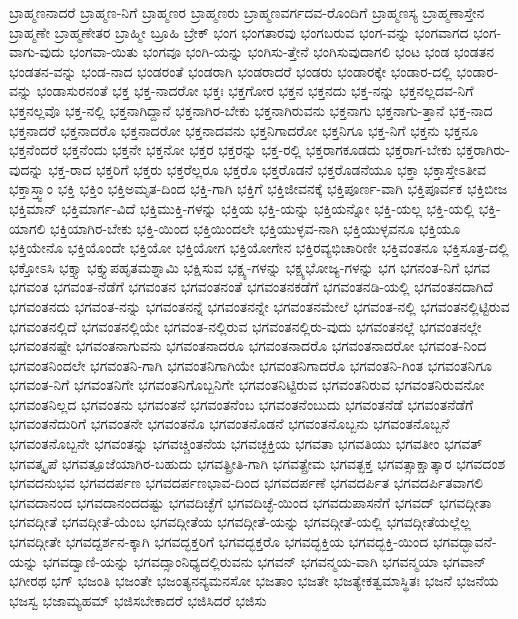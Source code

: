 {ಬ್ರಾಹ್ಮಣನಾದರೆ
ಬ್ರಾಹ್ಮಣ-ನಿಗೆ
ಬ್ರಾಹ್ಮಣರ
ಬ್ರಾಹ್ಮಣರು
ಬ್ರಾಹ್ಮಣವರ್ಗದವ-ರೊಂದಿಗೆ
ಬ್ರಾಹ್ಮಣಸ್ಯ
ಬ್ರಾಹ್ಮಣಾಸ್ತೇನ
ಬ್ರಾಹ್ಮಣೇ
ಬ್ರಾಹ್ಮಣೇತರ
ಬ್ರಾಹ್ಮೀ
ಬ್ರೂಹಿ
ಬ್ರೇಕ್
ಭಂಗ
ಭಂಗತಾರವು
ಭಂಗಬರುವ
ಭಂಗ-ವನ್ನು
ಭಂಗವಾಗದ
ಭಂಗ-ವಾಗು-ವುದು
ಭಂಗವಾ-ಯಿತು
ಭಂಗವೂ
ಭಂಗಿ-ಯನ್ನು
ಭಂಗಿಸು-ತ್ತೇನೆ
ಭಂಗಿಸುವುದಾಗಲಿ
ಭಂಟ
ಭಂಡ
ಭಂಡತನ
ಭಂಡತನ-ವನ್ನು
ಭಂಡ-ನಾದ
ಭಂಡರಂತೆ
ಭಂಡರಾಗಿ
ಭಂಡರಾದರೆ
ಭಂಡರು
ಭಂಡಾರಕ್ಕೇ
ಭಂಡಾರ-ದಲ್ಲಿ
ಭಂಡಾರ-ವನ್ನು
ಭಂಡಾಸುರನಂತೆ
ಭಕ್ತ
ಭಕ್ತ-ನಾದರೋ
ಭಕ್ತಃ
ಭಕ್ತಗೋರ
ಭಕ್ತನ
ಭಕ್ತನದು
ಭಕ್ತ-ನನ್ನು
ಭಕ್ತನಲ್ಲದವ-ನಿಗೆ
ಭಕ್ತನಲ್ಲವೊ
ಭಕ್ತ-ನಲ್ಲಿ
ಭಕ್ತನಾಗಿದ್ದಾನೆ
ಭಕ್ತನಾಗಿರ-ಬೇಕು
ಭಕ್ತನಾಗಿರುವನು
ಭಕ್ತನಾಗು
ಭಕ್ತನಾಗು-ತ್ತಾನೆ
ಭಕ್ತ-ನಾದ
ಭಕ್ತನಾದರೆ
ಭಕ್ತನಾದರೊ
ಭಕ್ತನಾದರೋ
ಭಕ್ತನಾದವನು
ಭಕ್ತನಿಗಾದರೋ
ಭಕ್ತನಿಗೂ
ಭಕ್ತ-ನಿಗೆ
ಭಕ್ತನು
ಭಕ್ತನೂ
ಭಕ್ತನೆಂದರೆ
ಭಕ್ತನೆಂದು
ಭಕ್ತನೇ
ಭಕ್ತನೋ
ಭಕ್ತರ
ಭಕ್ತರನ್ನು
ಭಕ್ತ-ರಲ್ಲಿ
ಭಕ್ತರಾಗಕೂಡದು
ಭಕ್ತರಾಗ-ಬೇಕು
ಭಕ್ತರಾಗಿರು-ವುದನ್ನು
ಭಕ್ತ-ರಾದ
ಭಕ್ತರಿಗೆ
ಭಕ್ತರು
ಭಕ್ತರೆಲ್ಲರೂ
ಭಕ್ತರೊ
ಭಕ್ತರೊಡನೆ
ಭಕ್ತರೊಡನೆಯೂ
ಭಕ್ತಾ
ಭಕ್ತಾಸ್ತೇಽತೀವ
ಭಕ್ತಾಸ್ತ್ವಾಂ
ಭಕ್ತಿ
ಭಕ್ತಿಂ
ಭಕ್ತಿಅಮೃತ-ದಿಂದ
ಭಕ್ತಿ-ಗಾಗಿ
ಭಕ್ತಿಗೆ
ಭಕ್ತಿಜೀವನಕ್ಕೆ
ಭಕ್ತಿಪೂರ್ಣ-ವಾಗಿ
ಭಕ್ತಿಪೂರ್ವಕ
ಭಕ್ತಿಬೀಜ
ಭಕ್ತಿಮಾನ್
ಭಕ್ತಿಮಾರ್ಗ-ವಿದೆ
ಭಕ್ತಿಮುಕ್ತಿ-ಗಳನ್ನು
ಭಕ್ತಿಯ
ಭಕ್ತಿ-ಯನ್ನು
ಭಕ್ತಿಯನ್ನೋ
ಭಕ್ತಿ-ಯಲ್ಲ
ಭಕ್ತಿ-ಯಲ್ಲಿ
ಭಕ್ತಿ-ಯಾಗಲಿ
ಭಕ್ತಿಯಾಗಿರ-ಬೇಕು
ಭಕ್ತಿ-ಯಿಂದ
ಭಕ್ತಿಯಿಂದಲೇ
ಭಕ್ತಿಯುಳ್ಳವ-ನಾಗಿ
ಭಕ್ತಿಯುಳ್ಳವನೂ
ಭಕ್ತಿಯೂ
ಭಕ್ತಿಯೇನೊ
ಭಕ್ತಿಯೊಂದೇ
ಭಕ್ತಿಯೋ
ಭಕ್ತಿಯೋಗ
ಭಕ್ತಿಯೋಗೇನ
ಭಕ್ತಿರವ್ಯಭಿಚಾರಿಣೀ
ಭಕ್ತಿವಂತನೂ
ಭಕ್ತಿಸೂತ್ರ-ದಲ್ಲಿ
ಭಕ್ತೋಽಸಿ
ಭಕ್ತ್ಯಾ
ಭಕ್ತ್ಯುಪಹೃತಮಶ್ನಾಮಿ
ಭಕ್ಷಿಸುವ
ಭಕ್ಷ್ಯ-ಗಳನ್ನು
ಭಕ್ಷ್ಯಭೋಜ್ಯ-ಗಳನ್ನು
ಭಗ
ಭಗನಂತ-ನಿಗೆ
ಭಗವ
ಭಗವಂತ
ಭಗವಂತ-ನೆಡೆಗೆ
ಭಗವಂತನ
ಭಗವಂತನಂತೆ
ಭಗವಂತನಕಡೆಗೆ
ಭಗವಂತನಡಿ-ಯಲ್ಲಿ
ಭಗವಂತನದಾಗಿದೆ
ಭಗವಂತನದು
ಭಗವಂತ-ನನ್ನು
ಭಗವಂತನನ್ನೆ
ಭಗವಂತನನ್ನೇ
ಭಗವಂತನಮೇಲೆ
ಭಗವಂತ-ನಲ್ಲಿ
ಭಗವಂತನಲ್ಲಿಟ್ಟಿರುವ
ಭಗವಂತನಲ್ಲಿದೆ
ಭಗವಂತನಲ್ಲಿಯೇ
ಭಗವಂತ-ನಲ್ಲಿರುವ
ಭಗವಂತನಲ್ಲಿರು-ವುದು
ಭಗವಂತನಲ್ಲೆ
ಭಗವಂತನಲ್ಲೇ
ಭಗವಂತನಷ್ಟೇ
ಭಗವಂತನಾಗುವನು
ಭಗವಂತನಾದರೂ
ಭಗವಂತನಾದರೊ
ಭಗವಂತನಾದರೋ
ಭಗವಂತ-ನಿಂದ
ಭಗವಂತನಿಂದಲೇ
ಭಗವಂತನಿ-ಗಾಗಿ
ಭಗವಂತನಿಗಾಗಿಯೇ
ಭಗವಂತನಿಗಾದರೊ
ಭಗವಂತನಿ-ಗಿಂತ
ಭಗವಂತನಿಗೂ
ಭಗವಂತ-ನಿಗೆ
ಭಗವಂತನಿಗೇ
ಭಗವಂತನಿಗೊಬ್ಬನಿಗೇ
ಭಗವಂತನಿಟ್ಟಿರುವ
ಭಗವಂತನಿರುವ
ಭಗವಂತನಿರುವನೋ
ಭಗವಂತನಿಲ್ಲದ
ಭಗವಂತನು
ಭಗವಂತನೆ
ಭಗವಂತನೆಂಬ
ಭಗವಂತನೆಂಬುದು
ಭಗವಂತನೆಡೆ
ಭಗವಂತನೆಡೆಗೆ
ಭಗವಂತನೆದುರಿಗೆ
ಭಗವಂತನೇ
ಭಗವಂತನೊ
ಭಗವಂತನೊಡನೆ
ಭಗವಂತನೊಬ್ಬನು
ಭಗವಂತನೊಬ್ಬನೆ
ಭಗವಂತನೊಬ್ಬನೇ
ಭಗವಂತನ್ನು
ಭಗವಚ್ಚಿಂತನೆಯ
ಭಗವಚ್ಛಕ್ತಿಯ
ಭಗವತಾ
ಭಗವತಿಯು
ಭಗವತೀಂ
ಭಗವತ್
ಭಗವತ್ಕೃಪೆ
ಭಗವತ್ಪೂಜೆಯಾಗಿರ-ಬಹುದು
ಭಗವತ್ಪ್ರೀತಿ-ಗಾಗಿ
ಭಗವತ್ಪ್ರೇಮ
ಭಗವತ್ಭಕ್ತ
ಭಗವತ್ಸಾಕ್ಷಾತ್ಕಾರ
ಭಗವದಂಶ
ಭಗವದನುಭವ
ಭಗವದರ್ಪಣ
ಭಗವದರ್ಪಣಭಾವ-ದಿಂದ
ಭಗವದರ್ಪಣೆ
ಭಗವದರ್ಪಿತ
ಭಗವದರ್ಪಿತವಾಗಲಿ
ಭಗವದಾನಂದ
ಭಗವದಾನಂದದಷ್ಟು
ಭಗವದಿಚ್ಛೆಗೆ
ಭಗವದಿಚ್ಛೆ-ಯಿಂದ
ಭಗವದುಪಾಸನೆಗೆ
ಭಗವದ್
ಭಗವದ್ಗೀತಾ
ಭಗವದ್ಗೀತೆ
ಭಗವದ್ಗೀತೆ-ಯೆಂಬ
ಭಗವದ್ಗೀತೆಯ
ಭಗವದ್ಗೀತೆ-ಯನ್ನು
ಭಗವದ್ಗೀತೆ-ಯಲ್ಲಿ
ಭಗವದ್ಗೀತೆಯಲ್ಲೆಲ್ಲ
ಭಗವದ್ಗೀತೇ
ಭಗವದ್ದರ್ಶನ-ಕ್ಕಾಗಿ
ಭಗವದ್ಭಕ್ತರಿಗೆ
ಭಗವದ್ಭಕ್ತರೊ
ಭಗವದ್ಭಕ್ತಿಯ
ಭಗವದ್ಭಕ್ತಿ-ಯಿಂದ
ಭಗವದ್ಭಾವನೆ-ಯನ್ನು
ಭಗವದ್ವಾಣಿ-ಯನ್ನು
ಭಗವದ್ಸಾಂನಿಧ್ಯದಲ್ಲಿರುವನು
ಭಗವನ್
ಭಗವನ್ಮಯ-ವಾಗಿ
ಭಗವನ್ಮಯಾ
ಭಗವಾನ್
ಭಗೀರಥ
ಭಗ್
ಭಜಂತಿ
ಭಜಂತೇ
ಭಜಂತ್ಯನನ್ಯಮನಸೋ
ಭಜತಾಂ
ಭಜತೇ
ಭಜತ್ಯೇಕತ್ವಮಾಸ್ಥಿತಃ
ಭಜನೆ
ಭಜನೆಯ
ಭಜಸ್ವ
ಭಜಾಮ್ಯಹಮ್
ಭಜಿಸಬೇಕಾದರೆ
ಭಜಿಸಿದರೆ
ಭಜಿಸು
}
